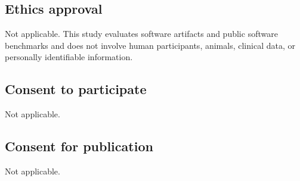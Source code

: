 \documentclass[pdflatex,sn-mathphys-num]{sn-jnl}
\begin{document}
\subsection*{Ethics approval}
Not applicable. This study evaluates software artifacts and public software
benchmarks and does not involve human participants, animals, clinical data, or
personally identifiable information.

\subsection*{Consent to participate}
Not applicable.

\subsection*{Consent for publication}
Not applicable.


\end{document}
